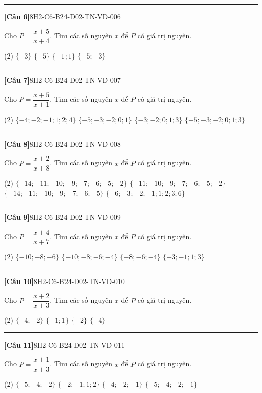 \documentclass[12pt,a4paper]{article}
\newif\ifloigiai
\newenvironment{cauhoi}[2]{%
  \par\medskip\noindent\rule{\textwidth}{0.4pt}\par\nopagebreak
  \noindent\textbf{[#1]}\hfill{\scriptsize\ttfamily #2}\par\nopagebreak\smallskip}{\par}
\newcommand{\dapan}[1]{\ifloigiai\par\smallskip\noindent\textit{Đáp án:} \textbf{#1}\par\fi}
\begin{document}
\begin{cauhoi}{Câu 6}{8H2-C6-B24-D02-TN-VD-006}
Cho $P=\dfrac{x+5}{x+4}$. Tìm các số nguyên $x$ để $P$ có giá trị nguyên.
\begin{tasks}(2)
\task $\{-3\}$
\task $\{-5\}$
\task $\{-1; 1\}$
\task $\{-5; -3\}$
\end{tasks}
\dapan{D}
\end{cauhoi}
\begin{cauhoi}{Câu 7}{8H2-C6-B24-D02-TN-VD-007}
Cho $P=\dfrac{x+5}{x+1}$. Tìm các số nguyên $x$ để $P$ có giá trị nguyên.
\begin{tasks}(2)
\task $\{-4; -2; -1; 1; 2; 4\}$
\task $\{-5; -3; -2; 0; 1\}$
\task $\{-3; -2; 0; 1; 3\}$
\task $\{-5; -3; -2; 0; 1; 3\}$
\end{tasks}
\dapan{D}
\end{cauhoi}
\begin{cauhoi}{Câu 8}{8H2-C6-B24-D02-TN-VD-008}
Cho $P=\dfrac{x+2}{x+8}$. Tìm các số nguyên $x$ để $P$ có giá trị nguyên.
\begin{tasks}(2)
\task $\{-14; -11; -10; -9; -7; -6; -5; -2\}$
\task $\{-11; -10; -9; -7; -6; -5; -2\}$
\task $\{-14; -11; -10; -9; -7; -6; -5\}$
\task $\{-6; -3; -2; -1; 1; 2; 3; 6\}$
\end{tasks}
\dapan{A}
\end{cauhoi}
\begin{cauhoi}{Câu 9}{8H2-C6-B24-D02-TN-VD-009}
Cho $P=\dfrac{x+4}{x+7}$. Tìm các số nguyên $x$ để $P$ có giá trị nguyên.
\begin{tasks}(2)
\task $\{-10; -8; -6\}$
\task $\{-10; -8; -6; -4\}$
\task $\{-8; -6; -4\}$
\task $\{-3; -1; 1; 3\}$
\end{tasks}
\dapan{B}
\end{cauhoi}
\begin{cauhoi}{Câu 10}{8H2-C6-B24-D02-TN-VD-010}
Cho $P=\dfrac{x+2}{x+3}$. Tìm các số nguyên $x$ để $P$ có giá trị nguyên.
\begin{tasks}(2)
\task $\{-4; -2\}$
\task $\{-1; 1\}$
\task $\{-2\}$
\task $\{-4\}$
\end{tasks}
\dapan{A}
\end{cauhoi}
\begin{cauhoi}{Câu 11}{8H2-C6-B24-D02-TN-VD-011}
Cho $P=\dfrac{x+1}{x+3}$. Tìm các số nguyên $x$ để $P$ có giá trị nguyên.
\begin{tasks}(2)
\task $\{-5; -4; -2\}$
\task $\{-2; -1; 1; 2\}$
\task $\{-4; -2; -1\}$
\task $\{-5; -4; -2; -1\}$
\end{tasks}
\dapan{D}
\end{cauhoi}
\end{document}
